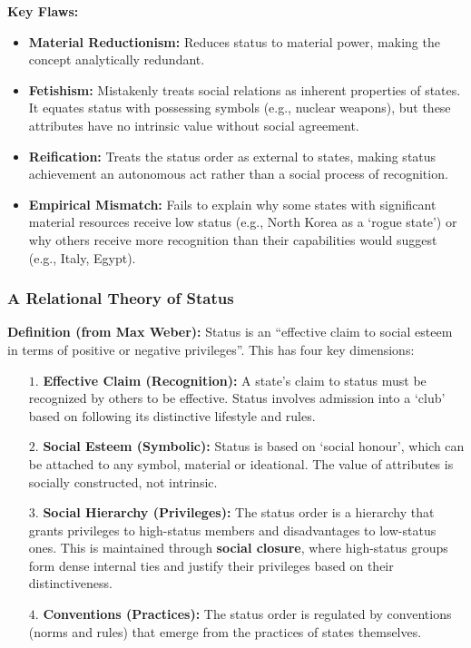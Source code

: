 \documentclass{article}
\begin{document}
    \noindent \textbf{Key Flaws:}
    \begin{itemize}
        \item \textbf{Material Reductionism:} Reduces status to material
        power, making the concept analytically redundant.
        \item \textbf{Fetishism:} Mistakenly treats social relations as
        inherent properties of states. It equates status with possessing
        symbols (e.g., nuclear weapons), but these attributes have no
        intrinsic value without social agreement.
        \item \textbf{Reification:} Treats the status order as external to
        states, making status achievement an autonomous act rather than a
        social process of recognition.
        \item \textbf{Empirical Mismatch:} Fails to explain why some states
        with significant material resources receive low status (e.g., North
        Korea as a `rogue state') or why others receive more recognition
        than their capabilities would suggest (e.g., Italy, Egypt).
    \end{itemize}

    \subsubsection{A Relational Theory of Status}

    \noindent \textbf{Definition (from Max Weber):} Status is an ``effective
claim to social esteem in terms of positive or negative privileges''. This
has four key dimensions:
    \begin{itemize}
        \item [$1$.] \textbf{Effective Claim (Recognition):} A state's claim
        to status must be recognized by others to be effective. Status
        involves admission into a `club' based on following its distinctive
        lifestyle and rules.
        \item[$2$.] \textbf{Social Esteem (Symbolic):} Status is based on
        `social honour', which can be attached to any symbol, material or
        ideational. The value of attributes is socially constructed, not
        intrinsic.
        \item[$3$.] \textbf{Social Hierarchy (Privileges):} The status order
        is a hierarchy that grants privileges to high-status members and
        disadvantages to low-status ones. This is maintained through
        \textbf{social closure}, where high-status groups form dense
        internal ties and justify their privileges based on their
        distinctiveness.
        \item[$4$.] \textbf{Conventions (Practices):} The status order is
        regulated by conventions (norms and rules) that emerge from the
        practices of states themselves.
    \end{itemize}
\end{document}
